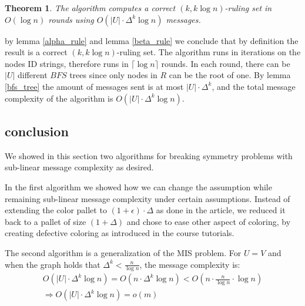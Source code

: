 \documentclass[11pt]{article}
\newtheorem{theorem}{Theorem}
\begin{document}
\begin{theorem}
\label{final_claim}
The algorithm computes a correct $(k, k\log{n})$-ruling set in $O(\log{n})$ rounds using $O(|U|\cdot\Delta^k\log{n})$ messages.
\end{theorem}
by lemma \ref{alpha_rule} and lemma \ref{beta_rule} we conclude that by definition the result is a correct $(k, k\log{n})$-ruling set. The algorithm runs in iterations on the nodes ID strings, therefore runs in $\lceil{\log{n}}\rceil$ rounds. In each round, there can be $|U|$ different $BFS$ trees since only nodes in $R$ can be the root of one. By lemma \ref{bfs_tree} the amount of messages sent is at most $|U|\cdot \Delta^k$, and the total message complexity of the algorithm is $O(|U|\cdot\Delta^k\log{n})$.

\subsection{conclusion}
We showed in this section two algorithms for breaking symmetry problems with sub-linear message complexity as desired.

In the first algorithm we showed how we can change the assumption while remaining sub-linear message complexity under certain assumptions. Instead of extending the color pallet to $(1 + \epsilon) \cdot \Delta$ as done in the article, we reduced it back to a pallet of size $(1+ \Delta)$ and chose to ease other aspect of coloring, by creating defective coloring as introduced in the course tutorials.

The second algorithm is a generalization of the MIS problem. For $U=V$ and when the graph holds that $\Delta^k < \frac{n}{\log{n}}$, the message complexity is:
\begin{gather*}
O(|U|\cdot \Delta^k\log{n}) = O(n\cdot\Delta^k\log{n}) < O(n\cdot \frac{n}{\log{n}}\cdot \log{n}) \\
\Rightarrow \boxed{O(|U|\cdot \Delta^k\log{n}) = o(m)}
\end{gather*}


\newpage



\end{document}
